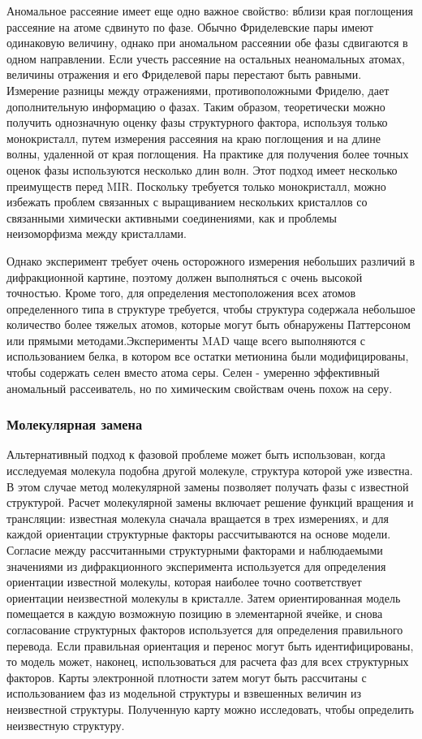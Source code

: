 \documentclass{article}
\begin{document}
Аномальное рассеяние имеет еще одно важное свойство: вблизи края поглощения рассеяние на атоме сдвинуто по фазе. Обычно Фриделевские пары имеют одинаковую величину, однако при аномальном рассеянии обе фазы сдвигаются в одном направлении. Если учесть рассеяние на остальных неаномальных атомах, величины отражения и его Фриделевой пары перестают быть равными. Измерение разницы между отражениями, противоположными Фриделю, дает дополнительную информацию о фазах. Таким образом, теоретически можно получить однозначную оценку фазы структурного фактора, используя только монокристалл, путем измерения рассеяния на краю поглощения и на длине волны, удаленной от края поглощения. На практике для получения более точных оценок фазы используются несколько длин волн. Этот подход имеет несколько преимуществ перед MIR. Поскольку требуется только монокристалл, можно избежать проблем связанных с выращиванием нескольких кристаллов со связанными химически активными соединениями, как и проблемы неизоморфизма между кристаллами. 

Однако эксперимент требует очень осторожного измерения небольших различий в дифракционной картине, поэтому должен выполняться с очень высокой точностью. Кроме того, для определения местоположения всех атомов определенного типа в структуре требуется, чтобы структура содержала небольшое количество более тяжелых атомов, которые могут быть обнаружены Паттерсоном или прямыми методами.Эксперименты MAD чаще всего выполняются с использованием белка, в котором все остатки метионина были модифицированы, чтобы содержать селен вместо атома серы. Селен - умеренно эффективный аномальный рассеиватель, но по химическим свойствам очень похож на серу.

\subsubsection{Молекулярная замена}
Альтернативный подход к фазовой проблеме может быть использован, когда исследуемая молекула подобна другой молекуле, структура которой уже известна. В этом случае метод молекулярной замены\cite{MolReplMethod} позволяет получать фазы с известной структурой. Расчет молекулярной замены включает решение функций вращения и трансляции: известная молекула сначала вращается в трех измерениях, и для каждой ориентации структурные факторы рассчитываются на основе модели. Согласие между рассчитанными структурными факторами и наблюдаемыми значениями из дифракционного эксперимента используется для определения ориентации известной молекулы, которая наиболее точно соответствует ориентации неизвестной молекулы в кристалле. Затем ориентированная модель помещается в каждую возможную позицию в элементарной ячейке, и снова согласование структурных факторов используется для определения правильного перевода. Если правильная ориентация и перенос могут быть идентифицированы, то модель может, наконец, использоваться для расчета фаз для всех структурных факторов. Карты электронной плотности затем могут быть рассчитаны с использованием фаз из модельной структуры и взвешенных величин из неизвестной структуры. Полученную карту можно исследовать, чтобы определить неизвестную структуру.
\end{document}
